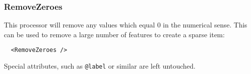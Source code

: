 \subsubsection{RemoveZeroes}

This processor will remove any values which equal 0 in the numerical
sense. This can be used to remove a large number of features to create a
sparse item:

\begin{verbatim}
  <RemoveZeroes />
\end{verbatim}
Special attributes, such as \texttt{@label} or similar are left
untouched.

